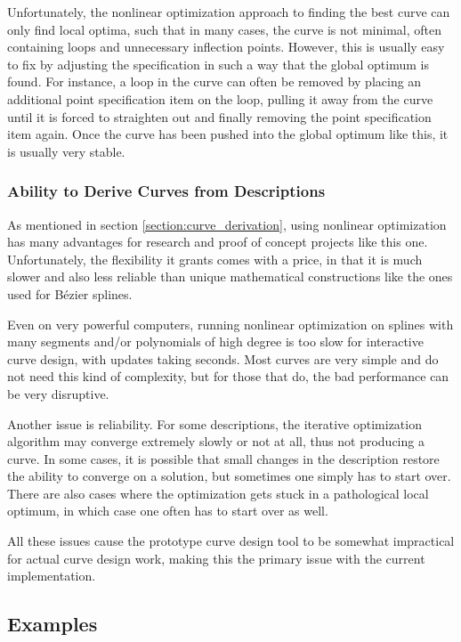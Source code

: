 \documentclass[a4paper]{article}
\begin{document}
				Unfortunately, the nonlinear optimization approach to finding the best curve can only find local optima, such that in many cases, the curve is not minimal, often containing loops and unnecessary inflection points. However, this is usually easy to fix by adjusting the specification in such a way that the global optimum is found. For instance, a loop in the curve can often be removed by placing an additional point specification item on the loop, pulling it away from the curve until it is forced to straighten out and finally removing the point specification item again. Once the curve has been pushed into the global optimum like this, it is usually very stable.

			\subsubsection{Ability to Derive Curves from Descriptions}
			\label{section:ability_derive_curves_descriptions}

				As mentioned in section \ref{section:curve_derivation}, using nonlinear optimization has many advantages for research and proof of concept projects like this one. Unfortunately, the flexibility it grants comes with a price, in that it is much slower and also less reliable than unique mathematical constructions like the ones used for Bézier splines.

				Even on very powerful computers, running nonlinear optimization on splines with many segments and/or polynomials of high degree is too slow for interactive curve design, with updates taking seconds. Most curves are very simple and do not need this kind of complexity, but for those that do, the bad performance can be very disruptive.

				Another issue is reliability. For some descriptions, the iterative optimization algorithm may converge extremely slowly or not at all, thus not producing a curve. In some cases, it is possible that small changes in the description restore the ability to converge on a solution, but sometimes one simply has to start over. There are also cases where the optimization gets stuck in a pathological local optimum, in which case one often has to start over as well.

				All these issues cause the prototype curve design tool to be somewhat impractical for actual curve design work, making this the primary issue with the current implementation.

		\subsection{Examples}
		\label{section:examples}
\end{document}
